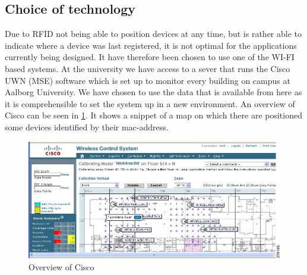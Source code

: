 


\subsection{Choice of technology}\label{subsec:cisco}
Due to RFID not being able to position devices at any time, but is rather able to indicate where a device was last registered, it is not optimal for the applications currently being designed. It have therefore been chosen to use one of the WI-FI based systems.
At the university we have access to a sever that runs the Cisco UWN (MSE) software which is set up to monitor every building on campus at Aalborg University. We have chosen to use the data that is available from here as it is comprehensible to set the system up in a new environment. An overview of Cisco can be seen in \cref{fig:cisco_overveiw}. It shows a snippet of a map on which there are positioned some devices identified by their mac-address.

\begin{figure}[h]
	\begin{center}
	\includegraphics[scale=1]{graphics/cisco_overview.png}
	\caption{Overview of Cisco\cite{cisco_overview}}
	\label{fig:cisco_overveiw}
	\end{center}
\end{figure}

